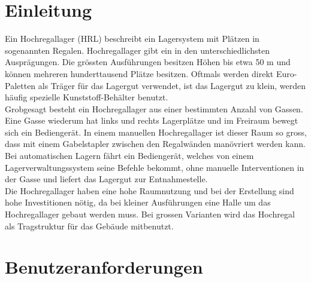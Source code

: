 \documentclass[11pt,a4paper]{article}
\begin{document}
\section{Einleitung}
Ein Hochregallager (HRL) beschreibt ein Lagersystem mit Plätzen in sogenannten Regalen. Hochregallager gibt ein in den unterschiedlichsten Ausprägungen. Die grössten Ausführungen besitzen Höhen bis etwa 50 m und können mehreren hunderttausend Plätze besitzen. Oftmals werden direkt Euro-Paletten als Träger für das Lagergut verwendet, ist das Lagergut zu klein, werden häufig spezielle Kunststoff-Behälter benutzt.\\
Grobgesagt besteht ein Hochregallager aus einer bestimmten Anzahl von Gassen. Eine Gasse wiederum hat links und rechts Lagerplätze und im Freiraum bewegt sich ein Bediengerät. In einem manuellen Hochregallager ist dieser Raum so gross, dass mit einem Gabelstapler zwischen den Regalwänden manövriert werden kann. Bei automatischen Lagern fährt ein Bediengerät, welches von einem Lagerverwaltungssystem seine Befehle bekommt, ohne manuelle Interventionen in der Gasse und liefert das Lagergut zur Entnahmestelle.\\
Die Hochregallager haben eine hohe Raumnutzung und bei der Erstellung sind hohe Investitionen nötig, da bei kleiner Ausführungen eine Halle um das Hochregallager gebaut werden muss. Bei grossen Varianten wird das Hochregal als Tragstruktur für das Gebäude mitbenutzt. 
%
\section{Benutzeranforderungen}
%
\end{document}
